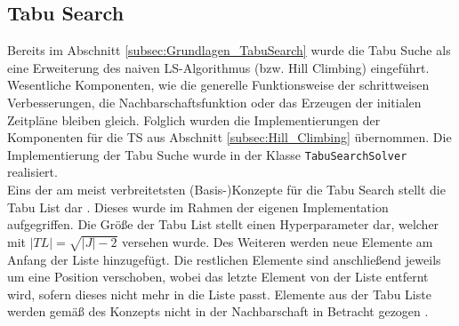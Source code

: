 \subsection{Tabu Search} \label{subsec:MetaheuristischeAlgorithmen_TabuSearch}

Bereits im Abschnitt \ref{subsec:Grundlagen_TabuSearch} wurde die Tabu Suche als eine Erweiterung des naiven \ac{LS}-Algorithmus (bzw. Hill Climbing) eingeführt. Wesentliche Komponenten, wie die generelle Funktionsweise der schrittweisen Verbesserungen, die Nachbarschaftsfunktion oder das Erzeugen der initialen Zeitpläne bleiben gleich. Folglich wurden die Implementierungen der Komponenten für die \ac{TS} aus Abschnitt \ref{subsec:Hill_Climbing} übernommen. Die Implementierung der Tabu Suche wurde in der Klasse \lstinline|TabuSearchSolver| realisiert. \\

Eins der am meist verbreitetsten (Basis-)Konzepte für die Tabu Search stellt die Tabu List dar \cite[vgl.][S. 42]{gendreau_handbook_2019}. Dieses wurde im Rahmen der eigenen Implementation aufgegriffen. Die Größe der Tabu List stellt einen Hyperparameter dar, welcher mit $|TL| = \sqrt{|J| - 2}$ versehen wurde. Des Weiteren werden neue Elemente am Anfang der Liste hinzugefügt. Die restlichen Elemente sind anschließend jeweils um eine Position verschoben, wobei das letzte Element von der Liste entfernt wird, sofern dieses nicht mehr in die Liste passt. Elemente aus der Tabu Liste werden gemäß des Konzepts nicht in der Nachbarschaft in Betracht gezogen \cite[vgl.][S. 42]{gendreau_handbook_2019}. 